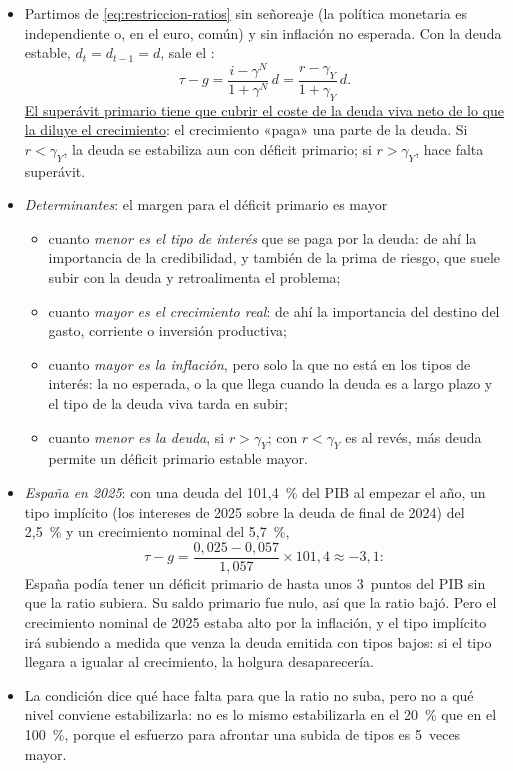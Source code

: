 \documentclass[11pt]{article}
\begin{document}
\begin{itemize}
\item Partimos de \eqref{eq:restriccion-ratios} sin señoreaje (la política monetaria es independiente o, en el euro, común) y sin inflación no esperada. Con la deuda estable, $d_t=d_{t-1}=d$, sale el :
  \begin{equation}\label{eq:saldo-estabilizador}
  \tau-g=\frac{i-\gamma^N}{1+\gamma^N}\,d=\frac{r-\gamma_Y}{1+\gamma_Y}\,d .
  \end{equation}
  \uline{El superávit primario tiene que cubrir el coste de la deuda viva neto de lo que la diluye el crecimiento}: el crecimiento «paga» una parte de la deuda. Si $r<\gamma_Y$, la deuda se estabiliza aun con déficit primario; si $r>\gamma_Y$, hace falta superávit.
\item \emph{Determinantes}: el margen para el déficit primario es mayor
  \begin{itemize}
  \item cuanto \emph{menor es el tipo de interés} que se paga por la deuda: de ahí la importancia de la credibilidad, y también de la prima de riesgo, que suele subir con la deuda y retroalimenta el problema;
  \item cuanto \emph{mayor es el crecimiento real}: de ahí la importancia del destino del gasto, corriente o inversión productiva;
  \item cuanto \emph{mayor es la inflación}, pero solo la que no está en los tipos de interés: la no esperada, o la que llega cuando la deuda es a largo plazo y el tipo de la deuda viva tarda en subir;
  \item cuanto \emph{menor es la deuda}, si $r>\gamma_Y$; con $r<\gamma_Y$ es al revés, más deuda permite un déficit primario estable mayor.
  \end{itemize}
\item \emph{España en 2025}: con una deuda del 101,4~\% del PIB al empezar el año, un tipo implícito (los intereses de 2025 sobre la deuda de final de 2024) del 2,5~\% y un crecimiento nominal del 5,7~\%\nocite{Eurostat2026EDP,Eurostat2026nama10gdp},
  \begin{equation*}
  \tau-g=\frac{0{,}025-0{,}057}{1{,}057}\times101{,}4\approx-3{,}1 :
  \end{equation*}
  España podía tener un déficit primario de hasta unos 3~puntos del PIB sin que la ratio subiera. Su saldo primario fue nulo, así que la ratio bajó. Pero el crecimiento nominal de 2025 estaba alto por la inflación, y el tipo implícito irá subiendo a medida que venza la deuda emitida con tipos bajos: si el tipo llegara a igualar al crecimiento, la holgura desaparecería.
\item La condición dice qué hace falta para que la ratio no suba, pero no a qué nivel conviene estabilizarla: no es lo mismo estabilizarla en el 20~\% que en el 100~\%, porque el esfuerzo para afrontar una subida de tipos es 5~veces mayor.
\end{itemize}
\end{document}
